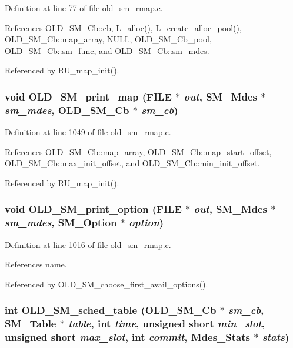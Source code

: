 Definition at line 77 of file old\_\-sm\_\-rmap.c.

References OLD\_\-SM\_\-Cb::cb, L\_\-alloc(), L\_\-create\_\-alloc\_\-pool(), OLD\_\-SM\_\-Cb::map\_\-array, NULL, OLD\_\-SM\_\-Cb\_\-pool, OLD\_\-SM\_\-Cb::sm\_\-func, and OLD\_\-SM\_\-Cb::sm\_\-mdes.

Referenced by RU\_\-map\_\-init().
\subsubsection{\setlength{\rightskip}{0pt plus 5cm}void OLD\_\-SM\_\-print\_\-map (FILE $\ast$ {\em out}, SM\_\-Mdes $\ast$ {\em sm\_\-mdes}, \bf{OLD\_\-SM\_\-Cb} $\ast$ {\em sm\_\-cb})}\label{old__sm_8h_a21abe36de254eb267e395ef14dcd133}




Definition at line 1049 of file old\_\-sm\_\-rmap.c.

References OLD\_\-SM\_\-Cb::map\_\-array, OLD\_\-SM\_\-Cb::map\_\-start\_\-offset, OLD\_\-SM\_\-Cb::max\_\-init\_\-offset, and OLD\_\-SM\_\-Cb::min\_\-init\_\-offset.

Referenced by RU\_\-map\_\-init().
\subsubsection{\setlength{\rightskip}{0pt plus 5cm}void OLD\_\-SM\_\-print\_\-option (FILE $\ast$ {\em out}, SM\_\-Mdes $\ast$ {\em sm\_\-mdes}, SM\_\-Option $\ast$ {\em option})}\label{old__sm_8h_76de179c12baa6033e082dd8776988b7}




Definition at line 1016 of file old\_\-sm\_\-rmap.c.

References name.

Referenced by OLD\_\-SM\_\-choose\_\-first\_\-avail\_\-options().
\subsubsection{\setlength{\rightskip}{0pt plus 5cm}int OLD\_\-SM\_\-sched\_\-table (\bf{OLD\_\-SM\_\-Cb} $\ast$ {\em sm\_\-cb}, SM\_\-Table $\ast$ {\em table}, int {\em time}, unsigned short {\em min\_\-slot}, unsigned short {\em max\_\-slot}, int {\em commit}, Mdes\_\-Stats $\ast$ {\em stats})}\label{old__sm_8h_e99a5403da030759f300328c3273fcdf}




